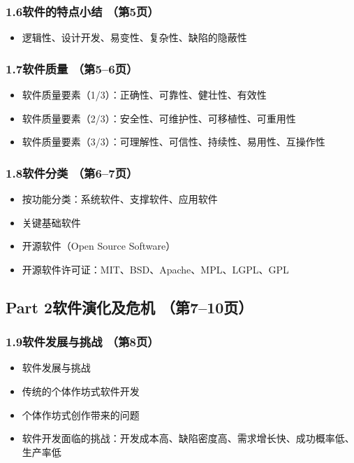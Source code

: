\documentclass[12pt,a4paper]{ctexart}
\begin{document}
\subsubsection{1.6\quad 软件的特点小结 \hfill（第5页）}
\begin{itemize}
    \item 逻辑性、设计开发、易变性、复杂性、缺陷的隐蔽性
\end{itemize}

\subsubsection{1.7\quad 软件质量 \hfill（第5--6页）}
\begin{itemize}
    \item 软件质量要素（1/3）：正确性、可靠性、健壮性、有效性
    \item 软件质量要素（2/3）：安全性、可维护性、可移植性、可重用性
    \item 软件质量要素（3/3）：可理解性、可信性、持续性、易用性、互操作性
\end{itemize}

\subsubsection{1.8\quad 软件分类 \hfill（第6--7页）}
\begin{itemize}
    \item 按功能分类：系统软件、支撑软件、应用软件
    \item 关键基础软件
    \item 开源软件（Open Source Software）
    \item 开源软件许可证：MIT、BSD、Apache、MPL、LGPL、GPL
\end{itemize}

\subsection{Part 2\quad 软件演化及危机 \hfill（第7--10页）}

\subsubsection{1.9\quad 软件发展与挑战 \hfill（第8页）}
\begin{itemize}
    \item 软件发展与挑战
    \item 传统的个体作坊式软件开发
    \item 个体作坊式创作带来的问题
    \item 软件开发面临的挑战：开发成本高、缺陷密度高、需求增长快、成功概率低、生产率低
\end{itemize}
\end{document}
